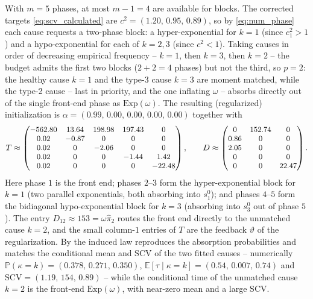 \documentclass{article}
\newcommand{\Prob}{\mathbb{P}}
\newcommand{\ex}[1]{\mathbb{E}\left[#1\right]}
\begin{document}
With $m=5$ phases, at most $m-1=4$ are available for blocks. The corrected targets \eqref{eq:scv_calculated} are $c^2 = (1.20,\,0.95,\,0.89)$, so by \eqref{eq:num_phase} each cause requests a two-phase block: a hyper-exponential for $k=1$ (since $c^2_1>1$) and a hypo-exponential for each of $k=2,3$ (since $c^2<1$). Taking causes in order of decreasing empirical frequency -- $k=1$, then $k=3$, then $k=2$ -- the budget admits the first two blocks ($2+2=4$ phases) but not the third, so $p=2$: the healthy cause $k=1$ and the type-3 cause $k=3$ are moment matched, while the type-2 cause -- last in priority, and the one inflating $\omega$ -- absorbs directly out of the single front-end phase as $\mathrm{Exp}(\omega)$. The resulting (regularized) initialization is $\alpha = (0.99,\,0.00,\,0.00,\,0.00,\,0.00)$ together with
\[
{\small
T \approx \begin{pmatrix}
-562.80 & 13.64 & 198.98 & 197.43 & 0\\
0.02 & -0.87 & 0 & 0 & 0\\
0.02 & 0 & -2.06 & 0 & 0\\
0.02 & 0 & 0 & -1.44 & 1.42\\
0.02 & 0 & 0 & 0 & -22.48
\end{pmatrix},
\qquad
D \approx \begin{pmatrix}
0 & 152.74 & 0\\
0.86 & 0 & 0\\
2.05 & 0 & 0\\
0 & 0 & 0\\
0 & 0 & 22.47
\end{pmatrix}.}
\]
Here phase $1$ is the front end; phases $2$--$3$ form the hyper-exponential block for $k=1$ (two parallel exponentials, both absorbing into $s^0_1$); and phases $4$--$5$ form the bidiagonal hypo-exponential block for $k=3$ (absorbing into $s^0_3$ out of phase $5$). The entry $D_{12}\approx153 = \omega\hat\pi_2$ routes the front end directly to the unmatched cause $k=2$, and the small column-$1$ entries of $T$ are the feedback $\vartheta$ of the regularization. By  the induced law reproduces the absorption probabilities and matches the conditional mean and SCV of the two fitted causes -- numerically $\Prob(\kappa=k) = (0.378,\,0.271,\,0.350)$, $\ex{\tau\mid\kappa=k} = (0.54,\,0.007,\,0.74)$ and $\mathrm{SCV} = (1.19,\,154,\,0.89)$ -- while the conditional time of the unmatched cause $k=2$ is the front-end $\mathrm{Exp}(\omega)$, with near-zero mean and a large SCV.
\end{document}
